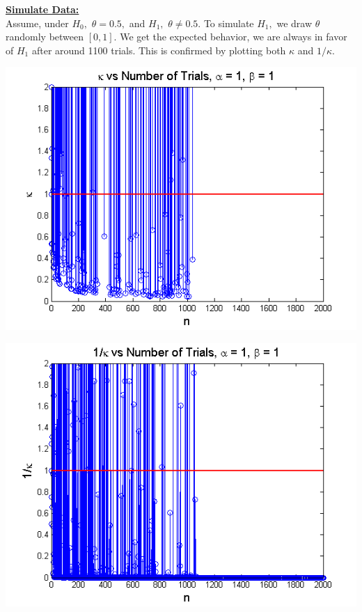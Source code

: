 \documentclass{article}
\begin{document}
\underline{\textbf{Simulate Data:}}\\ 

Assume, under $H_0,$ $\theta = 0.5,$ and $H_1,$ $\theta \neq 0.5.$ To simulate $H_1,$ we draw $\theta$ randomly between $[0,1].$ We get the expected behavior, we are always in favor of $H_1$ after  around 1100 trials. This is confirmed by plotting both $\kappa$ and $1/\kappa.$\\

\begin{left}
\includegraphics[scale=0.5]{KA1B1.png}
\end{left}
\begin{right}
\includegraphics[scale=0.5]{1overKA1B1.png}\\
\end{right}

\pagebreak
{}\\

\end{document}
